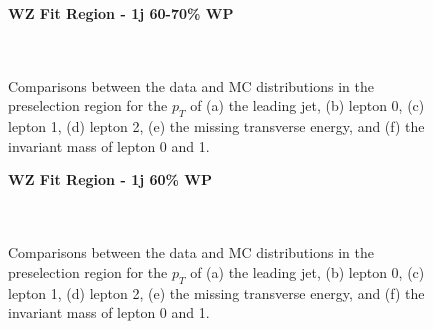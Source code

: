 \begin{figure}[h]
    \centering
    \textbf{WZ Fit Region - 1j 60-70\% WP}\\
    \\
    \\
    \caption{Comparisons between the data and MC distributions in the preselection region for the $p_T$ of (a) the leading jet, (b) lepton 0, (c) lepton 1, (d) lepton 2, (e) the missing transverse energy, and (f) the invariant mass of lepton 0 and 1.}
    \label{kin:WP_1j_60_70}
\end{figure}

\begin{figure}[h]
    \centering
    \textbf{WZ Fit Region - 1j 60\% WP}\\
    \\
    \\
    \caption{Comparisons between the data and MC distributions in the preselection region for the $p_T$ of (a) the leading jet, (b) lepton 0, (c) lepton 1, (d) lepton 2, (e) the missing transverse energy, and (f) the invariant mass of lepton 0 and 1.}
    \label{kin:WP_1j_60}    
\end{figure}

